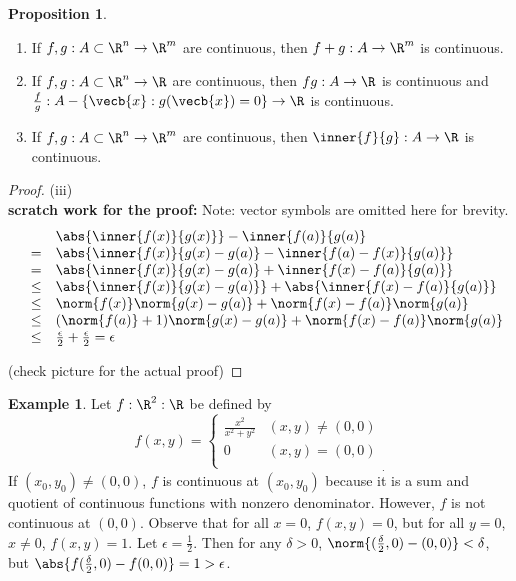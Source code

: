 \documentclass[a5paper]{article}
\theoremstyle{definition}%
\newtheorem{proposition}[theorem]{Proposition}
\newtheorem*{example*}{Example}
\numberwithin{exercise}{section}
\theoremstyle{remark}%
\begin{document}
\begin{highlight}
\begin{proposition}\mbox{}
\begin{enumerate}[label=(\roman*)]
\item If $f,g:A\subset \R^n \to \R^m$ are continuous, then $f+g:A \to \R^m$ is continuous.
\item If $f,g:A\subset \R^n \to \R$ are continuous, then $fg:A \to \R$ is continuous and $\frac{f}{g}:A-\{\vecb{x}:g(\vecb{x})=0\} \to \R$ is continuous.
\item If $f,g:A\subset \R^n \to \R^m$ are continuous, then $\inner{f}{g}:A \to \R$ is continuous.
\end{enumerate}
\end{proposition}
\end{highlight}
\begin{proof}(iii)\\
\textbf{scratch work for the proof:} 
Note: vector symbols are omitted here for brevity.
\[\begin{array}{rcl}
&&\abs{\inner{f(x)}{g(x)}}-\inner{f(a)}{g(a)}\\
&=&\abs{\inner{f(x)}{g(x)-g(a)}-\inner{f(a)-f(x)}{g(a)}}\\
&=&\abs{\inner{f(x)}{g(x)-g(a)}+\inner{f(x)-f(a)}{g(a)}}\\
&\leq&\abs{\inner{f(x)}{g(x)-g(a)}}+\abs{\inner{f(x)-f(a)}{g(a)}}\\%
&\leq&\norm{f(x)}\norm{g(x)-g(a)}+\norm{f(x)-f(a)}\norm{g(a)}\\%
&\leq&(\norm{f(a)}+1)\norm{g(x)-g(a)}+\norm{f(x)-f(a)}\norm{g(a)}\\
&\leq& \frac{\epsilon}{2} + \frac{\epsilon}{2} = \epsilon
\end{array}\]

(check picture for the actual proof)
\end{proof}

\begin{example*}
Let $f:\R^2:\R$ be defined by 
\[f(x,y)=
\begin{cases}
\frac{x^2}{x^2+y^2} & (x,y)\neq(0,0)\\
0 & (x,y)=(0,0)\\
\end{cases}_.\]
If $(x_0,y_0)\neq(0,0)$, $f$ is continuous at $(x_0,y_0)$ because it is a sum and quotient of continuous functions with nonzero denominator. However, $f$ is not continuous at $(0,0)$. Observe that for all $x=0$, $f(x,y)=0$, but for all $y=0$, $x\neq0$, $f(x,y)=1$. Let $\epsilon=\frac{1}{2}$. Then for any $\delta>0$, $\norm{(\frac{\delta}{2},0)-(0,0)}<\delta$, but $\abs{f(\frac{\delta}{2},0)-f(0,0)}=1>\epsilon$. 
\end{example*}
\end{document}
